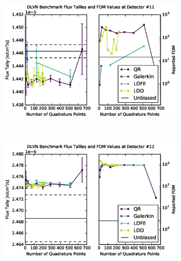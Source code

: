 \documentclass{article} %
\begin{document}
\begin{figure}[!htb]
\ContinuedFloat
\begin{subfigure}{\linewidth}
\centering
\includegraphics[max height=0.445\textheight]
{img/dlvn-fwcadis-11.eps}
\label{dlvn-fwc-11}
\end{subfigure}
\\
\begin{subfigure}{\linewidth}
\centering
\includegraphics[max height=0.445\textheight]
{img/dlvn-fwcadis-12.eps}
\label{dlvn-fwc-12}
\end{subfigure}
\end{figure}
\clearpage
\end{document}

